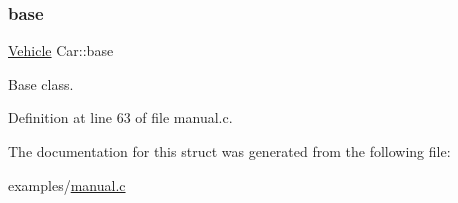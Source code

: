 \subsubsection{\texorpdfstring{base}{base}}
{\footnotesize\ttfamily \mbox{\hyperlink{struct_vehicle}{Vehicle}} Car\+::base\hspace{0.3cm}{\ttfamily [protected]}}



Base class. 



Definition at line 63 of file manual.\+c.



The documentation for this struct was generated from the following file\+:\begin{DoxyCompactItemize}
\item 
examples/\mbox{\hyperlink{manual_8c}{manual.\+c}}\end{DoxyCompactItemize}
